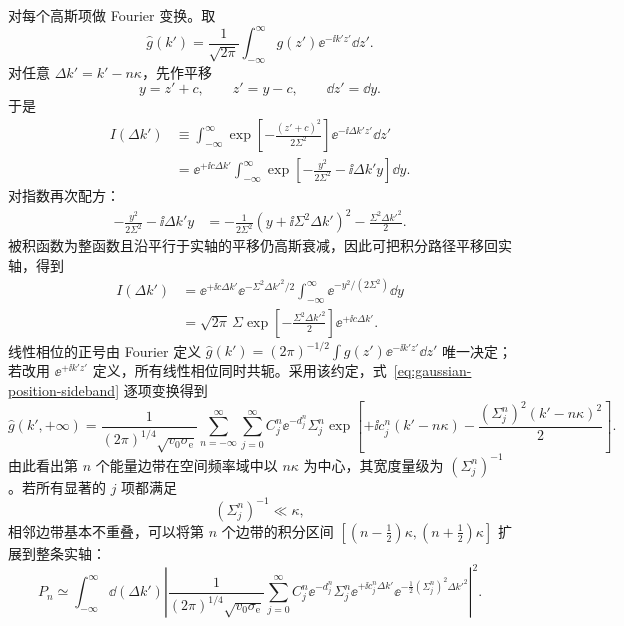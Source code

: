 对每个高斯项做 Fourier 变换。取
\begin{equation}
\widehat g(k')=\frac{1}{\sqrt{2\pi}}
\int_{-\infty}^{\infty}g(z')\ee^{-\ii k'z'}\dd z'.
\end{equation}
对任意 \(\Delta k'=k'-n\kappa\)，先作平移
\begin{equation}
y=z'+c,
\qquad z'=y-c,
\qquad \dd z'=\dd y.
\end{equation}
于是
\begin{align}
I(\Delta k')
&\equiv\int_{-\infty}^{\infty}
\exp\!\left[-\frac{(z'+c)^2}{2\Sigma^2}\right]
\ee^{-\ii\Delta k'z'}\dd z'\\
&=\ee^{+\ii c\Delta k'}
\int_{-\infty}^{\infty}
\exp\!\left[-\frac{y^2}{2\Sigma^2}-\ii\Delta k'y\right]\dd y.
\end{align}
对指数再次配方：
\begin{align}
-\frac{y^2}{2\Sigma^2}-\ii\Delta k'y
&=-\frac{1}{2\Sigma^2}
\left(y+\ii\Sigma^2\Delta k'\right)^2
-\frac{\Sigma^2\Delta k'^2}{2}.
\end{align}
被积函数为整函数且沿平行于实轴的平移仍高斯衰减，因此可把积分路径平移回实轴，得到
\begin{align}
I(\Delta k')
&=\ee^{+\ii c\Delta k'}
\ee^{-\Sigma^2\Delta k'^2/2}
\int_{-\infty}^{\infty}
\ee^{-y^2/(2\Sigma^2)}\dd y\\
&=\sqrt{2\pi}\,\Sigma
\exp\!\left[-\frac{\Sigma^2\Delta k'^2}{2}\right]
\ee^{+\ii c\Delta k'}.
\label{eq:gaussian_FT}
\end{align}
线性相位的正号由 Fourier 定义
$\widehat g(k')=(2\pi)^{-1/2}\int g(z')\ee^{-\ii k'z'}\dd z'$ 唯一决定；若改用 $\ee^{+\ii k'z'}$ 定义，所有线性相位同时共轭。采用该约定，式~\eqref{eq:gaussian-position-sideband} 逐项变换得到
\begin{equation}
\boxed{
\widehat g(k',+\infty)
=\frac{1}{(2\pi)^{1/4}\sqrt{v_0\sigma_{\mathrm e}}}
\sum_{n=-\infty}^{\infty}\sum_{j=0}^{\infty}
C_j^n\ee^{-d_j^n}\Sigma_j^n
\exp\!\left[
+\ii c_j^n(k'-n\kappa)
-\frac{(\Sigma_j^n)^2(k'-n\kappa)^2}{2}
\right].}
\label{eq:gaussian-fourier-term}
\end{equation}
由此看出第 \(n\) 个能量边带在空间频率域中以 \(n\kappa\) 为中心，其宽度量级为 \((\Sigma_j^n)^{-1}\)。若所有显著的 \(j\) 项都满足
\begin{equation}
(\Sigma_j^n)^{-1}\ll \kappa,
\label{eq:nonoverlap}
\end{equation}
相邻边带基本不重叠，可以将第 \(n\) 个边带的积分区间
\([
(n-\tfrac12)\kappa,(n+\tfrac12)\kappa]
\)
扩展到整条实轴：
\begin{equation}
P_n\simeq
\int_{-\infty}^{\infty}\dd(\Delta k')
\left|
\frac{1}{(2\pi)^{1/4}\sqrt{v_0\sigma_{\mathrm e}}}
\sum_{j=0}^{\infty}
C_j^n\ee^{-d_j^n}\Sigma_j^n
\ee^{+\ii c_j^n\Delta k'}
\ee^{-\frac12(\Sigma_j^n)^2\Delta k'^2}
\right|^2.
\label{eq:gaussian-sideband-momentum}
\end{equation}
